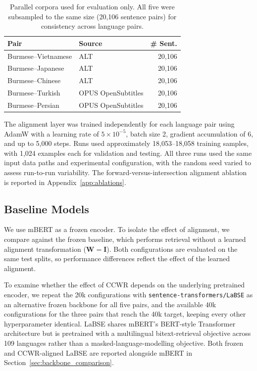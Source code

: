 \documentclass[11pt]{article}
\begin{document}
\begin{table}[h]
\centering
\small
\setlength{\tabcolsep}{4pt}
\caption{Parallel corpora used for evaluation only. All five were subsampled to the same size (20,106 sentence pairs) for consistency across language pairs.}
\label{tab:parallel_dataset}
\begin{tabular}{llr}
\toprule
\textbf{Pair} & \textbf{Source} & \textbf{\# Sent.} \\
\midrule
Burmese--Vietnamese & ALT           & 20,106 \\
Burmese--Japanese & ALT           & 20,106 \\
Burmese--Chinese & ALT           & 20,106 \\
Burmese--Turkish & OPUS OpenSubtitles & 20,106 \\
Burmese--Persian & OPUS OpenSubtitles & 20,106 \\
\bottomrule
\end{tabular}
\end{table}

The alignment layer was trained independently for each language pair using AdamW with a learning rate of $5\times10^{-5}$, batch size 2, gradient accumulation of 6, and up to 5,000 steps. Runs used approximately 18,053--18,058 training samples, with 1,024 examples each for validation and testing. All three runs used the same input data paths and experimental configuration, with the random seed varied to assess run-to-run variability. The forward-versus-intersection alignment ablation is reported in Appendix~\ref{app:ablations}.

\subsection{Baseline Models}
\label{sec:baselines}

We use mBERT \citep{devlin-etal-2019-bert}
as a frozen encoder. To isolate the effect of
alignment, we compare against the frozen baseline,
which performs retrieval without a learned
alignment transformation ($\mathbf{W} = \mathbf{I}$).
Both configurations are evaluated on the same
test splits, so performance differences reflect
the effect of the learned alignment.

To examine whether the effect of CCWR depends on the underlying
pretrained encoder, we repeat the 20k configurations with
\texttt{sentence-transformers/LaBSE} \citep{feng-etal-2022-language}
as an alternative frozen backbone for all five pairs, and the available
40k configurations for the three pairs that reach the 40k target,
keeping every other hyperparameter identical. LaBSE shares mBERT's BERT-style Transformer architecture but is pretrained with a multilingual bitext-retrieval objective across 109 languages rather than a masked-language-modelling objective. Both frozen and CCWR-aligned LaBSE are reported alongside mBERT in Section~\ref{sec:backbone_comparison}.
\end{document}
